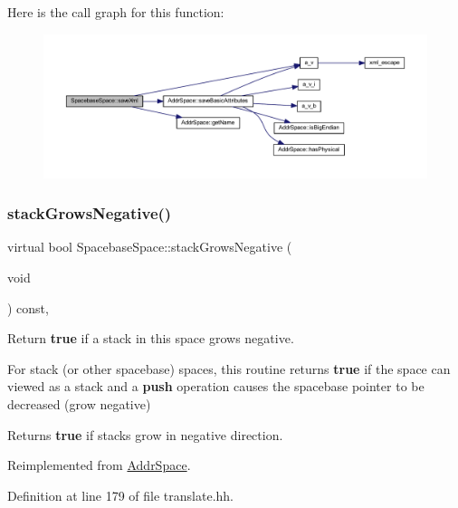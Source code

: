 Here is the call graph for this function\+:
\nopagebreak
\begin{figure}[H]
\begin{center}
\leavevmode
\includegraphics[width=350pt]{class_spacebase_space_ae98cc5d0f6f46274b1942aca597ce2ce_cgraph}
\end{center}
\end{figure}
\mbox{\label{class_spacebase_space_abade76813d5936d68f715cfde95a764c}} 
\subsubsection{\texorpdfstring{stackGrowsNegative()}{stackGrowsNegative()}}
{\footnotesize\ttfamily virtual bool Spacebase\+Space\+::stack\+Grows\+Negative (\begin{DoxyParamCaption}\item[{void}]{ }\end{DoxyParamCaption}) const\hspace{0.3cm}{\ttfamily [inline]}, {\ttfamily [virtual]}}



Return {\bfseries{true}} if a stack in this space grows negative. 

For stack (or other spacebase) spaces, this routine returns {\bfseries{true}} if the space can viewed as a stack and a {\bfseries{push}} operation causes the spacebase pointer to be decreased (grow negative) \begin{DoxyReturn}{Returns}
{\bfseries{true}} if stacks grow in negative direction. 
\end{DoxyReturn}


Reimplemented from \mbox{\hyperlink{class_addr_space_a9468b2d0bc4cdaa762e213fb395ac434}{Addr\+Space}}.



Definition at line 179 of file translate.\+hh.



